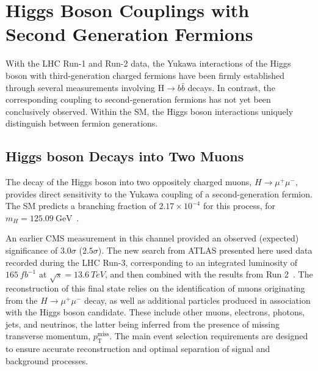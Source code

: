 \documentclass[a4paper,11pt]{article}
\begin{document}
\section{Higgs Boson Couplings with Second Generation Fermions}

With the LHC Run-1 and Run-2 data, the Yukawa interactions of the
Higgs boson with third-generation charged fermions have been firmly
established through several measurements involving $\textrm{H}\to b\bar b$ decays. In contrast, the
corresponding coupling to second-generation fermions has not yet been
conclusively observed. Within the SM, the Higgs boson
interactions uniquely distinguish between fermion generations.

\subsection{Higgs boson Decays into Two Muons}


The decay of the Higgs boson into two oppositely charged muons, $H \to
\mu^+\mu^-$, provides direct sensitivity to the Yukawa coupling of a
second-generation fermion. The SM predicts a branching fraction of
$2.17 \times 10^{-4}$ for this process, for $m_H =
125.09~\mathrm{GeV}$~\cite{yr2}.

An earlier CMS measurement in this channel provided an observed
(expected) significance of $3.0\sigma$ ($2.5\sigma$). The new search
from ATLAS presented here used data recorded during the LHC Run-3,
corresponding to an integrated luminosity of $\SI{165}{fb^{-1}}$ at
$\sqrt{s}=\SI{13.6}{TeV}$, and then combined with the results from Run
2~\cite{hmumu-atlas}.  The reconstruction of this final state relies on the
identification of muons originating from the $H \to \mu^+\mu^-$ decay,
as well as additional particles produced in association with the Higgs
boson candidate. These include other muons, electrons, photons, jets,
and neutrinos, the latter being inferred from the presence of missing
transverse momentum, $p_\mathrm{T}^{\text{miss}}$. The main event
selection requirements are designed to ensure accurate reconstruction
and optimal separation of signal and background processes.
\end{document}

